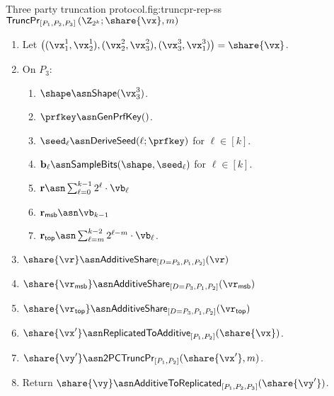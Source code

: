 \begin{Boxfig}{Three party truncation protocol.}{fig:truncpr-rep-ss}{$\mathsf{TruncPr}_{[P_1, P_2, P_3]} \left(\Z_{2^k}; \share{\vx}, m \right)$}
\begin{enumerate}
  \item Let $\left( (\vx_1^1, \vx_2^1), (\vx_2^2, \vx_3^2), (\vx_3^3, \vx_1^3) \right) = \share{\vx}$.
  
  \item On $P_3$:
  \begin{enumerate}
    \item $\shape \asn \mathsf{Shape}(\vx^3_3)$.
    \item $\prfkey \asn \mathsf{GenPrfKey}()$.
    \item $\seed_\ell \asn \mathsf{DeriveSeed}(\ell; \prfkey)$ for $\ell \in [k]$.
    \item $\mathbf{b}_\ell \asn \mathsf{SampleBits}(\shape, \seed_\ell)$ for $\ell \in [k]$.
    \item $\mathbf{r} \asn \sum_{\ell=0}^{k-1}2^\ell \cdot \vb_\ell$
    \item $\mathbf{r}_{\mathsf{msb}} \asn \vb_{k-1}$
    \item $\mathbf{r}_{\mathsf{top}} \asn \sum_{\ell=m}^{k-2} 2^{\ell-m} \cdot \vb_\ell$.
  \end{enumerate}

  \item $\share{\vr} \asn \mathsf{AdditiveShare}_{[D=P_3, P_1, P_2]}(\vr)$

  \item $\share{\vr_{\mathsf{msb}}} \asn \mathsf{AdditiveShare}_{[D=P_3, P_1, P_2]}(\vr_{\mathsf{msb}})$

  \item $\share{\vr_{\mathsf{top}}} \asn \mathsf{AdditiveShare}_{[D=P_3, P_1, P_2]}(\vr_{\mathsf{top}})$
 
  \item $\share{\vx'} \asn \mathsf{ReplicatedToAdditive}_{[P_1, P_2]}(\share{\vx})$.

  \item $\share{\vy'} \asn \mathsf{2PCTruncPr}_{[P_1, P_2]}(\share{\vx'}, m)$.

  \item Return $\share{\vy} \asn \mathsf{AdditiveToReplicated}_{[P_1, P_2, P_3]}(\share{\vy'})$.

\end{enumerate}

\end{Boxfig}

